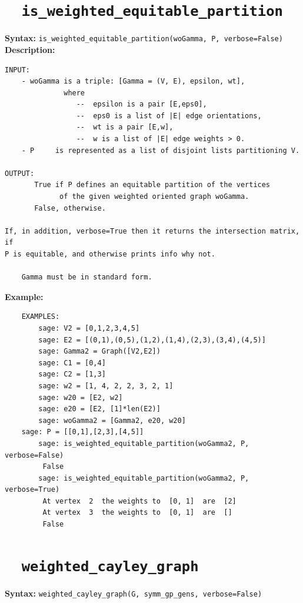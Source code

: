 \documentclass{article}
\begin{document}
\section{\tt \ \ is\_weighted\_equitable\_partition}

\textbf{Syntax:} \verb}is_weighted_equitable_partition(woGamma, P, verbose=False)}\\

\textbf{Description:}
\begin{verbatim}
INPUT:
    - woGamma is a triple: [Gamma = (V, E), epsilon, wt], 
              where 
                 --  epsilon is a pair [E,eps0], 
                 --  eps0 is a list of |E| edge orientations,
                 --  wt is a pair [E,w],   
                 --  w is a list of |E| edge weights > 0.
    - P     is represented as a list of disjoint lists partitioning V.

OUTPUT:  
       True if P defines an equitable partition of the vertices
             of the given weighted oriented graph woGamma.
       False, otherwise.

If, in addition, verbose=True then it returns the intersection matrix, if
P is equitable, and otherwise prints info why not.

    Gamma must be in standard form.

\end{verbatim}

\textbf{Example:}
\begin{verbatim}
    EXAMPLES:
        sage: V2 = [0,1,2,3,4,5]
        sage: E2 = [(0,1),(0,5),(1,2),(1,4),(2,3),(3,4),(4,5)]
        sage: Gamma2 = Graph([V2,E2])
        sage: C1 = [0,4]
        sage: C2 = [1,3]
        sage: w2 = [1, 4, 2, 2, 3, 2, 1]
        sage: w20 = [E2, w2]
        sage: e20 = [E2, [1]*len(E2)]
        sage: woGamma2 = [Gamma2, e20, w20]
	sage: P = [[0,1],[2,3],[4,5]]
        sage: is_weighted_equitable_partition(woGamma2, P, verbose=False)
         False
        sage: is_weighted_equitable_partition(woGamma2, P, verbose=True)
         At vertex  2  the weights to  [0, 1]  are  [2]
         At vertex  3  the weights to  [0, 1]  are  []
         False
\end{verbatim}

\section{\tt \ \ weighted\_cayley\_graph}

\textbf{Syntax:} \verb}weighted_cayley_graph(G, symm_gp_gens, verbose=False)}\\
\end{document}
